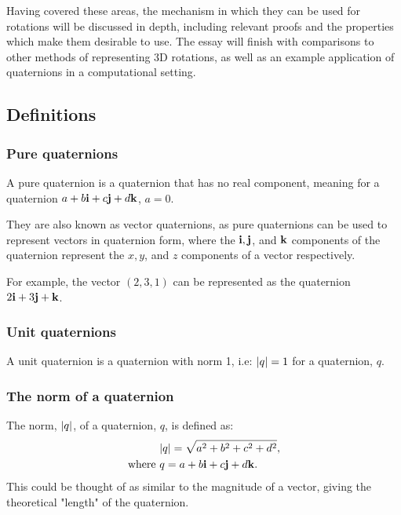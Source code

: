 \documentclass[10pt]{article}
\begin{document}
Having covered these areas, the mechanism in which they can be used for rotations will be discussed in depth, including relevant proofs and the properties which make them desirable to use. The essay will finish with comparisons to other methods of representing 3D rotations, as well as an example application of quaternions in a computational setting.

\subsection{Definitions}

\subsubsection{Pure quaternions} \label{PureDef}

A pure quaternion is a quaternion that has no real component, meaning for a quaternion $a + b\vb{i} + c\vb{j} + d\vb{k}$, $a = 0$. \cite{Math431}

They are also known as vector quaternions, as pure quaternions can be used to represent vectors in quaternion form, where the $\vb{i, j}$, and $\vb{k}$ components of the quaternion represent the $x, y$, and $z$ components of a vector respectively.

For example, the vector $(2,3,1)$ can be represented as the quaternion $2\vb{i} + 3\vb{j} + \vb{k}$.

\subsubsection{Unit quaternions}

A unit quaternion is a quaternion with norm 1, i.e: $\abs{q} = 1$ for a quaternion, $q$. \cite{DRose}

\subsubsection{The norm of a quaternion}

The norm, $\abs{q}$, of a quaternion, $q$, is defined as:
\begin{equation}
    \begin{aligned}
        &\abs{q} = \sqrt{a^2 + b^2 + c^2 + d^2}, \\
        \text{where } & q = a + b\vb{i} + c\vb{j} + d\vb{k}.
    \end{aligned} 
\end{equation}
This could be thought of as similar to the magnitude of a vector, giving the theoretical "length" of the quaternion. \cite{Math431}
\end{document}
